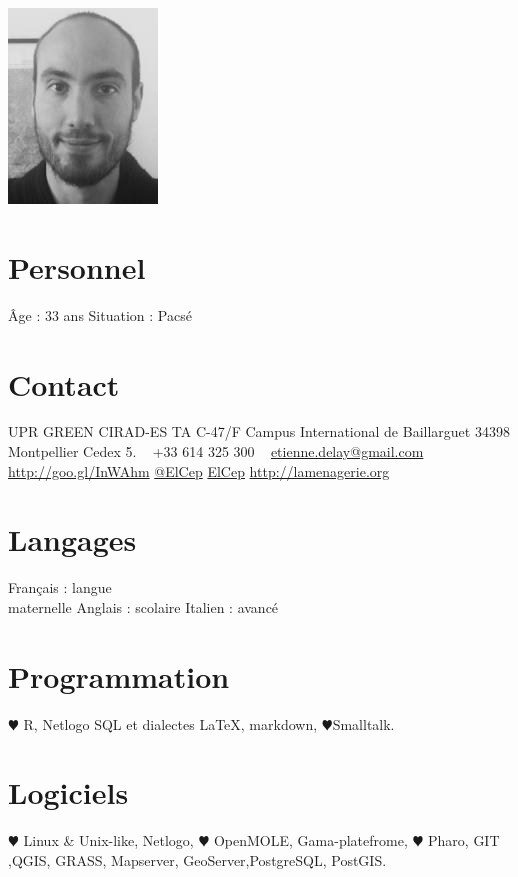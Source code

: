 \documentclass[]{cv-etienne}
\begin{document}

\begin{aside} %
\includegraphics{img/delay_s}
\section{Personnel}
Âge : 33 ans
Situation : Pacsé
\section{Contact}
UPR GREEN
CIRAD-ES
TA C-47/F
Campus International de Baillarguet
34398 Montpellier Cedex 5.
~
+33 614 325 300
~
{\color{lightgray}{\FA \faEnvelope}} \href{mailto:etienne.delay@gmail.com}{\footnotesize etienne.delay@gmail.com}
{\color{linkedin}{\FA \faLinkedin}} \href{https://fr.linkedin.com/in/etienne-delay-8871a45b}{\footnotesize http://goo.gl/InWAhm}
{\color{twitter}{\FA \faTwitter}} {\footnotesize \href{https://twitter.com/ElCep}{@ElCep}}
{\color{github}{\FA \faGithub}} {\footnotesize \href{https://github.com/ElCep}{ElCep}}
{\color{lightgray}{\FA \faHome}} {\footnotesize \href{http://elcep.legtux.org}{http://lamenagerie.org}}
\section{Langages}
Français : langue\\ maternelle
Anglais : scolaire
Italien : avancé
\section{Programmation}
{\color{red} $\varheartsuit$} R, Netlogo
SQL et dialectes
\LaTeX, markdown,
{\color{red} $\varheartsuit$}Smalltalk.
\section{Logiciels}
{\color{red} $\varheartsuit$} Linux \& Unix-like,
Netlogo, {\color{red} $\varheartsuit$} OpenMOLE,
Gama-platefrome,
{\color{red} $\varheartsuit$} Pharo, GIT ,QGIS,
GRASS, Mapserver, GeoServer,PostgreSQL, PostGIS.
\end{aside}
\end{document}
